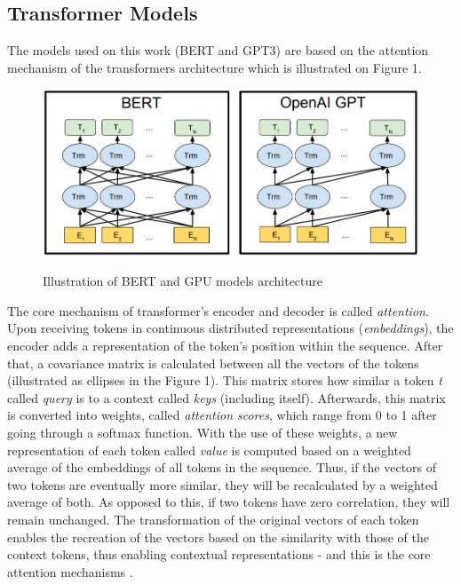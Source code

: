 \documentclass{article}
\begin{document}
\subsection{Transformer Models}

The models used on this work (BERT and GPT3) are based on the attention mechanism of the transformers architecture which is illustrated on Figure 1.

\begin{figure}[h!]
    \centering
    \caption{Illustration of BERT and GPU models architecture}
    \includegraphics[width=0.75\columnwidth]{figures/4.png}
    \label{fig:3}
    \\
\end{figure}

The core mechanism of transformer's encoder and decoder is called \textit{attention}. Upon receiving tokens in continuous distributed representations (\textit{embeddings}), the encoder adds a representation of the token's position within the sequence. After that, a covariance matrix is calculated between all the vectors of the tokens (illustrated as ellipses in the Figure 1). This matrix stores how similar a token \textit{t} called \textit{query} is to a context called \textit{keys} (including itself). Afterwards, this matrix is converted into weights, called \textit{attention scores}, which range from 0 to 1 after going through a softmax function. With the use of these weights, a new representation of each token called \textit{value} is computed based on a weighted average of the embeddings of all tokens in the sequence. Thus, if the vectors of two tokens are eventually more similar, they will be recalculated by a weighted average of both. As opposed to this, if two tokens have zero correlation, they will remain unchanged. The transformation of the original vectors of each token enables the recreation of the vectors based on the similarity with those of the context tokens, thus enabling contextual representations - and this is the core attention mechanisms \cite{peltarion22}.
\end{document}
